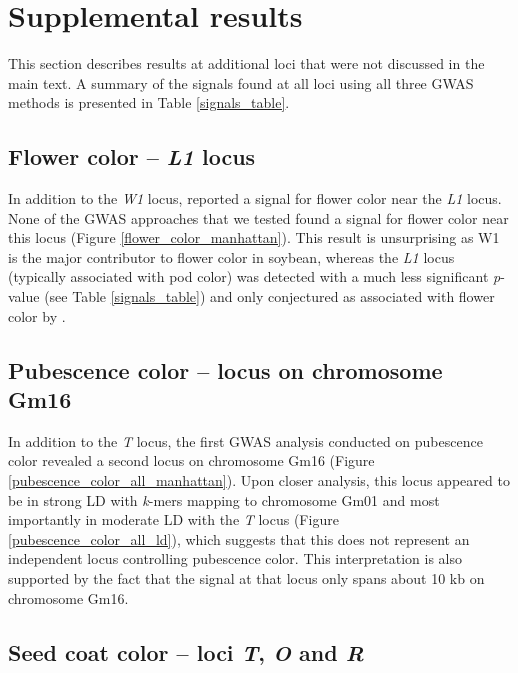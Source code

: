 \documentclass[12pt]{report}
\begin{document}
\section*{Supplemental results}
\label{annexe-sv-gwas-detailed-results}

This section describes results at additional loci that were not discussed in
the main text. A summary of the signals found at all loci using all three GWAS
methods is presented in Table \ref{signals_table}.

\subsection*{Flower color -- \textit{L1} locus}
\label{annexe-sv-gwas-flower-color-l1}

In addition to the \textit{W1} locus, \cite{bandillo2017} reported a signal for
flower color near the \textit{L1} locus.  None of the GWAS approaches that we
tested found a signal for flower color near this locus (Figure
\ref{flower_color_manhattan}). This result is unsurprising as W1 is the major
contributor to flower color in soybean, whereas the \textit{L1} locus
(typically associated with pod color) was detected with a much less significant
\textit{p}-value (see Table \ref{signals_table}) and only conjectured as
associated with flower color by \cite{bandillo2017}.

\subsection*{Pubescence color -- locus on chromosome Gm16}
\label{annexe-sv-gwas-pubescence-color-gm16}

In addition to the \textit{T} locus, the first GWAS analysis conducted on pubescence color
revealed a second locus on chromosome Gm16
(Figure \ref{pubescence_color_all_manhattan}). Upon closer analysis, this locus
appeared to be in strong LD with \emph{k}-mers mapping to chromosome Gm01 and
most importantly in moderate LD with the \emph{T} locus (Figure
\ref{pubescence_color_all_ld}), which suggests that this does not represent an
independent locus controlling pubescence color. This interpretation is also
supported by the fact that the signal at that locus only spans about 10 kb on
chromosome Gm16.

\subsection*{Seed coat color -- loci \textit{T}, \textit{O} and \textit{R}}
\label{annexe-sv-gwas-seed-coat-color-t-o}
\end{document}
